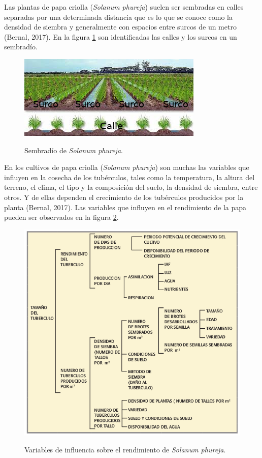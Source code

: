 Las plantas de papa criolla (\textit{Solanum phureja}) suelen ser sembradas en calles separadas por una determinada distancia que es lo que se conoce como la densidad de siembra y generalmente con espacios entre surcos de un metro (Bernal, 2017). En la figura \ref{fig:surcos} son identificadas las calles y los surcos en un sembradío. \\

\begin{figure}[h]
	\caption{Sembradío de \textit{Solanum phureja}.}
	\centering
	\includegraphics[scale=1]{surcos.jpeg}
	\label{fig:surcos}
\end{figure}

En los cultivos de papa criolla (\textit{Solanum phureja}) son muchas las variables que influyen en la cosecha de los tubérculos, tales como la temperatura, la altura del terreno, el clima, el tipo y la composición del suelo, la densidad de siembra, entre otros. Y de ellas dependen el crecimiento de los tubérculos producidos por la planta (Bernal, 2017). Las variables que influyen en el rendimiento de la papa pueden ser observados en la figura \ref{fig:variablesPapa}. \\

\begin{figure}[h]
	\caption{Variables de influencia sobre el rendimiento de \textit{Solanum phureja}.}
	\centering
	\includegraphics[scale=0.5]{variables.png}
	\label{fig:variablesPapa}
\end{figure}


